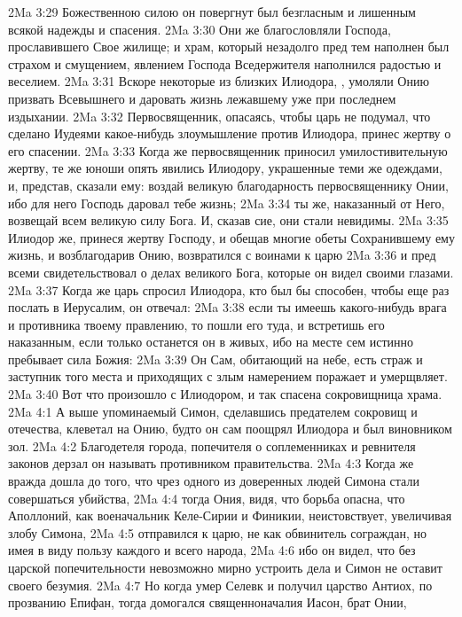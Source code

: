\vs 2Ma 3:29 Божественною силою он повергнут был безгласным и лишенным всякой надежды и спасения.
\vs 2Ma 3:30 Они же благословляли Господа, прославившего Свое жилище; и храм, который незадолго пред тем наполнен был страхом и смущением, явлением Господа Вседержителя наполнился радостью и веселием.
\vs 2Ma 3:31 Вскоре некоторые из близких Илиодора, , умоляли Онию призвать Всевышнего и даровать жизнь лежавшему уже при последнем издыхании.
\vs 2Ma 3:32 Первосвященник, опасаясь, чтобы царь не подумал, что сделано Иудеями какое-нибудь злоумышление против Илиодора, принес жертву о его спасении.
\vs 2Ma 3:33 Когда же первосвященник приносил умилостивительную жертву, те же юноши опять явились Илиодору, украшенные теми же одеждами, и, представ, сказали ему: воздай великую благодарность первосвященнику Онии, ибо для него Господь даровал тебе жизнь;
\vs 2Ma 3:34 ты же, наказанный от Него, возвещай всем великую силу Бога. И, сказав сие, они стали невидимы.
\vs 2Ma 3:35 Илиодор же, принеся жертву Господу, и обещав многие обеты Сохранившему ему жизнь, и возблагодарив Онию, возвратился с воинами к царю
\vs 2Ma 3:36 и пред всеми свидетельствовал о делах великого Бога, которые он видел своими глазами.
\vs 2Ma 3:37 Когда же царь спросил Илиодора, кто был бы способен, чтобы еще раз послать в Иерусалим, он отвечал:
\vs 2Ma 3:38 если ты имеешь какого-нибудь врага и противника твоему правлению, то пошли его туда, и встретишь его наказанным, если только останется он в живых, ибо на месте сем истинно пребывает сила Божия:
\vs 2Ma 3:39 Он Сам, обитающий на небе, есть страж и заступник того места и приходящих с злым намерением поражает и умерщвляет.
\vs 2Ma 3:40 Вот что произошло с Илиодором, и так спасена сокровищница храма.
\vs 2Ma 4:1 А выше упоминаемый Симон, сделавшись предателем сокровищ и отечества, клеветал на Онию, будто он сам поощрял Илиодора и был виновником зол.
\vs 2Ma 4:2 Благодетеля города, попечителя о соплеменниках и ревнителя законов дерзал он называть противником правительства.
\vs 2Ma 4:3 Когда же вражда дошла до того, что чрез одного из доверенных людей Симона стали совершаться убийства,
\vs 2Ma 4:4 тогда Ония, видя, что борьба опасна, что Аполлоний, как военачальник Келе-Сирии и Финикии, неистовствует, увеличивая злобу Симона,
\vs 2Ma 4:5 отправился к царю, не как обвинитель сограждан, но имея в виду пользу каждого и всего народа,
\vs 2Ma 4:6 ибо он видел, что без царской попечительности невозможно мирно устроить дела и Симон не оставит своего безумия.
\vs 2Ma 4:7 Но когда умер Селевк и получил царство Антиох, по прозванию Епифан, тогда домогался священноначалия Иасон, брат Онии,
